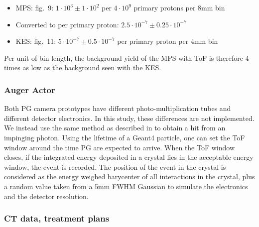 \documentclass[a4paper,english]{article}
\begin{document}
\begin{itemize}[noitemsep]
\item MPS: \cite{Pinto2014a} fig.~9: $1 \cdot 10^{3} \pm 1 \cdot 10^{2}$ per $4\cdot10^9$ primary protons per 8mm bin
\item[] Converted to per primary proton: $2.5 \cdot 10^{-7} \pm 0.25 \cdot 10^{-7}$
\item KES: \cite{Perali2014} fig.~11: $5 \cdot 10^{-7} \pm 0.5 \cdot 10^{-7}$ per primary proton per 4mm bin
\end{itemize}

Per unit of bin length, the background yield of the MPS with ToF is therefore 4 times as low as the background seen with the KES.%

\subsubsection{Auger Actor}

Both PG camera prototypes have different photo-multiplication tubes and different detector electronics. In this study, these differences are not implemented. We instead use the same method as described in \cite{Gueth2013} to obtain a hit from an impinging photon. Using the lifetime of a Geant4 particle, one can set the ToF window around the time PG are expected to arrive. When the ToF window closes, if the integrated energy deposited in a crystal lies in the acceptable energy window, the event is recorded. The position of the event in the crystal is considered as the energy weighed barycenter of all interactions in the crystal, plus a random value taken from a 5mm FWHM Gaussian to simulate the electronics and the detector resolution. %

\subsubsection{CT data, treatment plans}
\end{document}
